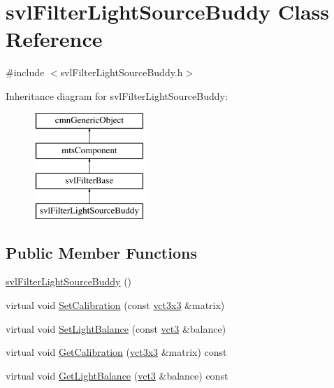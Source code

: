 \hypertarget{classsvl_filter_light_source_buddy}{}\section{svl\+Filter\+Light\+Source\+Buddy Class Reference}
\label{classsvl_filter_light_source_buddy}


{\ttfamily \#include $<$svl\+Filter\+Light\+Source\+Buddy.\+h$>$}

Inheritance diagram for svl\+Filter\+Light\+Source\+Buddy\+:\begin{figure}[H]
\begin{center}
\leavevmode
\includegraphics[height=4.000000cm]{db/d93/classsvl_filter_light_source_buddy}
\end{center}
\end{figure}
\subsection*{Public Member Functions}
\begin{DoxyCompactItemize}
\item 
\hyperlink{classsvl_filter_light_source_buddy_a3d9c37c1ac817a4bdb8e3730367b8a7e}{svl\+Filter\+Light\+Source\+Buddy} ()
\item 
virtual void \hyperlink{classsvl_filter_light_source_buddy_a48c257c05859aebea52b30257179430a}{Set\+Calibration} (const \hyperlink{vct_fixed_size_matrix_types_8h_aac4a419dacf9282410675d42ebc86a7c}{vct3x3} \&matrix)
\item 
virtual void \hyperlink{classsvl_filter_light_source_buddy_a95dc47d1ca817264469f0cbfe8a808fc}{Set\+Light\+Balance} (const \hyperlink{vct_fixed_size_vector_types_8h_a3af82acdbf4eeb73c551909240b106ea}{vct3} \&balance)
\item 
virtual void \hyperlink{classsvl_filter_light_source_buddy_a692de87991bb2ba0c9c227d65775e1f2}{Get\+Calibration} (\hyperlink{vct_fixed_size_matrix_types_8h_aac4a419dacf9282410675d42ebc86a7c}{vct3x3} \&matrix) const 
\item 
virtual void \hyperlink{classsvl_filter_light_source_buddy_a9db6ec607790cf43891d33919459f926}{Get\+Light\+Balance} (\hyperlink{vct_fixed_size_vector_types_8h_a3af82acdbf4eeb73c551909240b106ea}{vct3} \&balance) const 
\end{DoxyCompactItemize}
